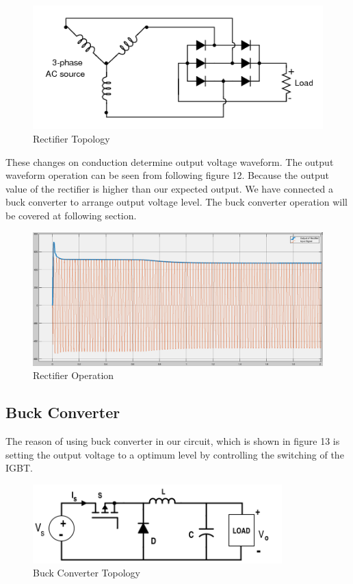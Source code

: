\documentclass{article}
\begin{document}
\begin{figure}[h!]
\centering
\includegraphics[scale=0.4]{ucfaz}
\caption{Rectifier Topology}
\label{fig:members}
\end{figure}

These changes on conduction determine output voltage waveform. The output waveform operation can be seen from following figure 12. Because the output value of the rectifier is higher than our expected output. We have connected a buck converter to arrange output voltage level. The buck converter operation will be covered at following section.
\begin{figure}[h!]
\centering
\includegraphics[scale=0.25]{ucfazrectvoltage}
\caption{Rectifier Operation}
\label{fig:members}
\end{figure}


\subsection{Buck Converter}

The reason of using buck converter in our circuit, which is shown in figure 13 is setting the output voltage to a optimum level by controlling the switching of the IGBT.
\begin{figure}[H]
\centering
\includegraphics[scale=0.7]{bucktopo}
\caption{Buck Converter Topology}
\label{fig:members}
\end{figure} 
\end{document}
